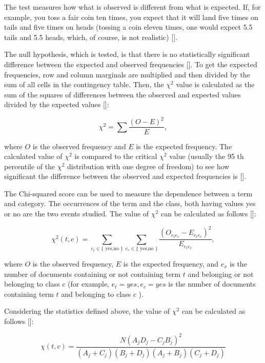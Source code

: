 The test measures how what is observed is different from what is expected. If, for example, you toss a fair coin ten times, you expect that it will land five times on tails and five times on heads (tossing a coin eleven times, one would expect 5.5 tails and 5.5 heads, which, of course, is not realistic) [\cite{ref251}].

The null hypothesis, which is tested, is that there is no statistically significant difference between the expected and observed frequencies [\cite{ref132}]. To get the expected frequencies, row and column marginals are multiplied and then divided by the sum of all cells in the contingency table. Then, the $\chi^{2}$ value is calculated as the sum of the squares of differences between the observed and expected values divided by the expected values [\cite{ref93}]:


\begin{equation*}
\chi^{2}=\sum \frac{(O-E)^{2}}{E}, \tag{14.1}
\end{equation*}


where $O$ is the observed frequency and $E$ is the expected frequency. The calculated value of $\chi^{2}$ is compared to the critical $\chi^{2}$ value (usually the 95 th percentile of the $\chi^{2}$ distribution with one degree of freedom) to see how significant the difference between the observed and expected frequencies is [\cite{ref48}].

The Chi-squared score can be used to measure the dependence between a term and category. The occurrences of the term and the class, both having values yes or no are the two events studied. The value of $\chi^{2}$ can be calculated as follows [\cite{ref185}]:


\begin{equation*}
\chi^{2}(t, c)=\sum_{e_{t} \in\{\text { yes,no }\}} \sum_{e_{c} \in\{\text { yes,no }\}} \frac{\left(O_{e_{t} e_{c}}-E_{e_{t} e_{c}}\right)^{2}}{E_{e_{t} e_{c}}}, \tag{14.2}
\end{equation*}


where $O$ is the observed frequency, $E$ is the expected frequency, and $e_{x}$ is the number of documents containing or not containing term $t$ and belonging or not belonging to class $c$ (for example, $e_{t}=y e s, e_{c}=y e s$ is the number of documents containing term $t$ and belonging to class $c$ ).

Considering the statistics defined above, the value of $\chi^{2}$ can be calculated as follows [\cite{ref286}]:


\begin{equation*}
\chi(t, c)=\frac{N\left(A_{j} D_{j}-C_{j} B_{j}\right)^{2}}{\left(A_{j}+C_{j}\right)\left(B_{j}+D_{j}\right)\left(A_{j}+B_{j}\right)\left(C_{j}+D_{j}\right)} \tag{14.3}
\end{equation*}


